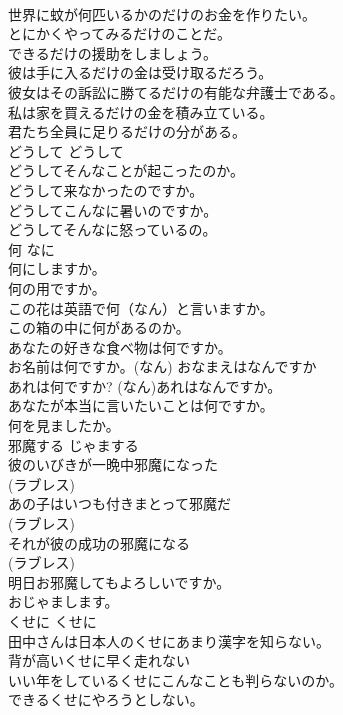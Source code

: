 \documentclass[8pt]{extreport}
\begin{document}
\begin{CJK}{UTF8}{min}
\\	世界に蚊が何匹いるかのだけのお金を作りたい。  
\\	とにかくやってみるだけのことだ。  
\\	できるだけの援助をしましょう。  
\\	彼は手に入るだけの金は受け取るだろう。  
\\	彼女はその訴訟に勝てるだけの有能な弁護士である。  
\\	私は家を買えるだけの金を積み立ている。  
\\	君たち全員に足りるだけの分がある。  
\\	どうして	どうして	
\\	どうしてそんなことが起こったのか。
\\	どうして来なかったのですか。
\\	どうしてこんなに暑いのですか。
\\	どうしてそんなに怒っているの。
\\	何	なに	
\\	何にしますか。
\\	何の用ですか。
\\	この花は英語で何（なん）と言いますか。  
\\	この箱の中に何があるのか。  
\\	あなたの好きな食べ物は何ですか。  
\\	お名前は何ですか。(なん) おなまえはなんですか 
\\	あれは何ですか? (なん)あれはなんですか。
\\	あなたが本当に言いたいことは何ですか。  
\\	何を見ましたか。  
\\	邪魔する	じゃまする 
\\	彼のいびきが一晩中邪魔になった   
\\	(ラブレス)
\\	あの子はいつも付きまとって邪魔だ   
\\	(ラブレス)
\\	それが彼の成功の邪魔になる   
\\	(ラブレス)
\\	明日お邪魔してもよろしいですか。   
\\	おじゃまします。  
\\	くせに	くせに	
\\	田中さんは日本人のくせにあまり漢字を知らない。  
\\	背が高いくせに早く走れない  
\\	いい年をしているくせにこんなことも判らないのか。  
\\	できるくせにやろうとしない。  

\end{CJK}
\end{document}
